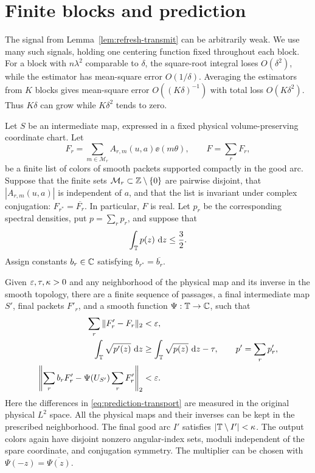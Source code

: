 \section{Finite blocks and prediction}
\label{sec:blocks}

The signal from Lemma~\ref{lem:refresh-transmit} can be arbitrarily
weak. We use many such signals, holding one centering function fixed
throughout each block. For a block with $n\lambda^2$ comparable to
$\delta$, the square-root integral loses $O(\delta^2)$, while the
estimator has mean-square error $O(1/\delta)$. Averaging the estimators
from $K$ blocks gives mean-square error $O((K\delta)^{-1})$ with total
loss $O(K\delta^2)$. Thus $K\delta$ can grow while $K\delta^2$ tends
to zero.

\begin{proposition}
\label{prop:prediction}
Let $S$ be an intermediate map, expressed in a fixed physical
volume-preserving coordinate chart.  Let
\[
 F_r=\sum_{m\in\mathcal M_r} A_{r,m}(u,a)\ee(m\theta),
 \qquad F=\sum_r F_r,
\]
be a finite list of colors of smooth packets supported compactly in the
good arc.  Suppose that the finite sets
$\mathcal M_r\subset\mathbb Z\setminus\{0\}$ are pairwise disjoint, that
$|A_{r,m}(u,a)|$ is independent of $a$, and that the list is invariant
under complex conjugation: $F_{r^*}=\overline{F_r}$.  In particular, $F$
is real.  Let $p_r$ be the corresponding spectral densities, put
$p=\sum_r p_r$, and suppose that
\[
 \int_\mathbb T p(z)\,\,\mathrm d z\le \frac32.
\]
Assign constants $b_r\in\mathbb C$ satisfying
$b_{r^*}=\overline{b_r}$.

Given $\varepsilon,\tau,\kappa>0$ and any neighborhood of the physical map
and its inverse in the smooth topology, there are a finite sequence of
passages, a final intermediate map $S'$, final packets $F'_r$, and a
smooth function $\Psi:\mathbb T\to\mathbb C$, such that
\begin{align}
 \sum_r\|F'_r-F_r\|_2&<\varepsilon,
 \label{eq:prediction-transport}\\
 \int_\mathbb T\sqrt{p'(z)}\,\,\mathrm d z
 &\ge \int_\mathbb T\sqrt{p(z)}\,\,\mathrm d z-\tau,
 \qquad p'=\sum_r p'_r,
 \label{eq:prediction-hellinger}\\
 \left\|\sum_r b_rF'_r-
       \Psi(U_{S'})\sum_r F'_r\right\|_2&<\varepsilon.
 \label{eq:prediction-error}
\end{align}
Here the differences in \eqref{eq:prediction-transport} are measured
in the original physical $L^2$ space.  All the physical maps and their
inverses can be kept in the prescribed neighborhood.  The final good
arc $I'$ satisfies $|\mathbb T\setminus I'|<\kappa$.
The output colors again have disjoint nonzero angular-index sets,
moduli independent of the spare coordinate, and conjugation symmetry.
The multiplier can be chosen with
$\Psi(-z)=\overline{\Psi(z)}$.
\end{proposition}

